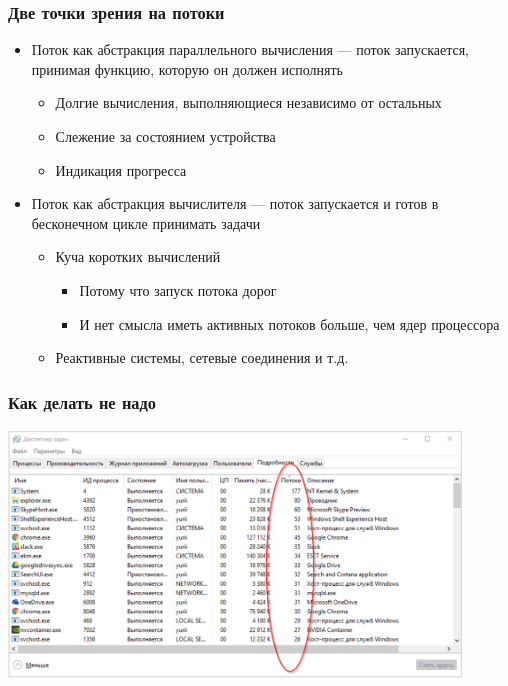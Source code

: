 \documentclass{../../slides-style}
\begin{document}
    \begin{frame}
        \frametitle{Две точки зрения на потоки}
        \begin{itemize}
            \item Поток как абстракция параллельного вычисления --- поток запускается, принимая функцию, которую он должен исполнять
            \begin{itemize}
                \item Долгие вычисления, выполняющиеся независимо от остальных
                \item Слежение за состоянием устройства
                \item Индикация прогресса
            \end{itemize}
            \item Поток как абстракция вычислителя --- поток запускается и готов в бесконечном цикле принимать задачи
            \begin{itemize}
                \item Куча коротких вычислений
                \begin{itemize}
                    \item Потому что запуск потока дорог
                    \item И нет смысла иметь активных потоков больше, чем ядер процессора
                \end{itemize}
                \item Реактивные системы, сетевые соединения и т.д.
            \end{itemize}
        \end{itemize}
    \end{frame}

    \begin{frame}
        \frametitle{Как делать не надо}
        \begin{center}
            \includegraphics[width=0.9\textwidth]{threadsEverywhere.png}
        \end{center}
    \end{frame}
\end{document}

